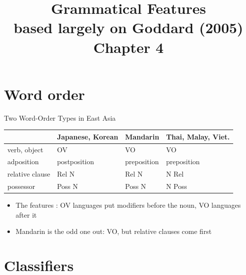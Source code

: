 \documentclass{beamer}
\title[Grammar]{Grammatical Features\\ based largely on Goddard (2005) Chapter 4}
\begin{document}
  \frame{\titlepage}

\overview

\section{Word order}

\begin{frame}{Two Word-Order Types in East Asia}
  \large
  \begin{center}
  \begin{tabular}{llll}
    \toprule
    & Japanese, Korean & Mandarin & Thai, Malay, Viet. \\
    \midrule
    verb, object    & OV           & VO          & VO \\
    adposition      & postposition & preposition & preposition \\
    relative clause & Rel N        & \alert{Rel N} & N Rel \\
    possessor       & Poss N       & Poss N      & N Poss \\
    \bottomrule
  \end{tabular}
  \end{center}

  \vfill
  \normalsize
  \begin{itemize}
  \item The features : OV languages put modifiers before the
    noun, VO languages after it
  \item Mandarin is the odd one out: VO, but relative clauses come first
  \end{itemize}
\end{frame}

\section{Classifiers}
\end{document}
